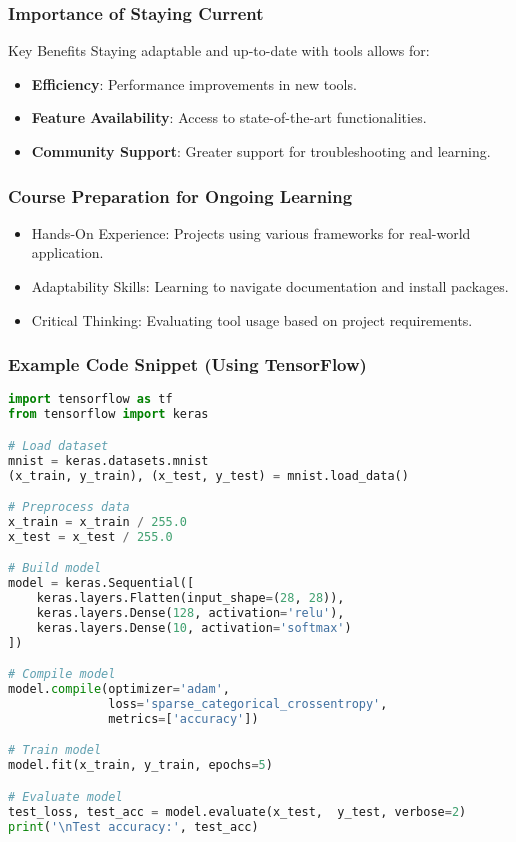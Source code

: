 \documentclass[aspectratio=169]{beamer}
\begin{document}
\begin{frame}
    \frametitle{Importance of Staying Current}
    
    \begin{block}{Key Benefits}
        Staying adaptable and up-to-date with tools allows for:
        \begin{itemize}
            \item \textbf{Efficiency}: Performance improvements in new tools.
            \item \textbf{Feature Availability}: Access to state-of-the-art functionalities.
            \item \textbf{Community Support}: Greater support for troubleshooting and learning.
        \end{itemize}
    \end{block}
\end{frame}

\begin{frame}
    \frametitle{Course Preparation for Ongoing Learning}
    
    \begin{itemize}
        \item Hands-On Experience: Projects using various frameworks for real-world application.
        \item Adaptability Skills: Learning to navigate documentation and install packages.
        \item Critical Thinking: Evaluating tool usage based on project requirements.
    \end{itemize}
\end{frame}

\begin{frame}[fragile]
    \frametitle{Example Code Snippet (Using TensorFlow)}
    
    \begin{lstlisting}[language=Python]
import tensorflow as tf
from tensorflow import keras

# Load dataset
mnist = keras.datasets.mnist
(x_train, y_train), (x_test, y_test) = mnist.load_data()

# Preprocess data
x_train = x_train / 255.0
x_test = x_test / 255.0

# Build model
model = keras.Sequential([
    keras.layers.Flatten(input_shape=(28, 28)),
    keras.layers.Dense(128, activation='relu'),
    keras.layers.Dense(10, activation='softmax')
])

# Compile model
model.compile(optimizer='adam', 
              loss='sparse_categorical_crossentropy', 
              metrics=['accuracy'])

# Train model
model.fit(x_train, y_train, epochs=5)

# Evaluate model
test_loss, test_acc = model.evaluate(x_test,  y_test, verbose=2)
print('\nTest accuracy:', test_acc)
\end{lstlisting}
\end{frame}
\end{document}
